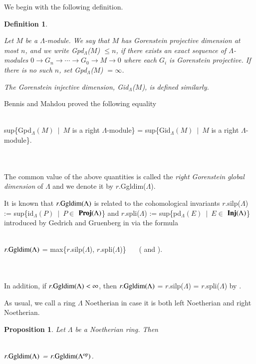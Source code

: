 \documentclass[11pt,a4paper]{article}
\newtheorem{prop}[thm]{Proposition}
\newtheorem{defn}[thm]{Definition}
\begin{document}
We begin with the following definition.

\begin{defn} \label{defn3} \rm{ Let $M$ be a    $\Lambda$-module.  We say that  $M$ has {\it Gorenstein projective
dimension} at most  $n$, and we write  Gpd$_{\Lambda}$($M$) $\leq n$, if there exists an exact sequence
of  $\Lambda$-modules $ 0 \rightarrow G_n\rightarrow
\cdots \rightarrow G_0\rightarrow M\rightarrow 0$ where each $G_{i}$ is Gorenstein projective. If there is no such $n$, set   Gpd$_{\Lambda}$($M$)
$=\infty$.

The {\it Gorenstein injective
dimension},  Gid$_{\Lambda}$($M$), is     defined similarly.}\end{defn}

Bennis   and Mahdou    \cite[Theorem 1.1]{bem} proved the     following equality
\\  \\
\centerline{   sup\{Gpd$_{\Lambda}(M)$\ $|$\ $M$     is  a  right  $\Lambda$-module\} =  sup\{Gid$_{\Lambda}(M)$\ $|$\ $M$     is  a  right  $\Lambda$-module\}.}\\ \\
The  common value of the above quantities is called the {\it right Gorenstein global
dimension} of $\Lambda$ and we denote it by     $r$.Ggldim($\Lambda$).

It is  known that $   r.{\rm Ggldim(}\Lambda)$  is related to the cohomological invariants $r$.silp($\Lambda$) := sup\{id$_{\Lambda}(P)$\ $|$\ $P\in$     ${\bf Proj}(\Lambda)$\} and $r$.spli($\Lambda$)  := sup\{pd$_{\Lambda}(E)$\ $|$\ $E \in$    ${\bf Inj}(\Lambda)$\}
introduced by Gedrich and Gruenberg in \cite{ged}  via the formula  \\
 \\
\centerline{ {\rm  $   r.{\rm Ggldim(}\Lambda)$ }{\rm = max\{$r$.silp($\Lambda$),  $r$.spli($\Lambda$)\}} \ \ \ (\cite[Theorem 3.3]{bou1} and  \cite[Theorem 2.1]{mad1}).}
 \\
 \\
In addition,  if  $   r.{\rm Ggldim(}\Lambda) < \infty$, then {\rm  $   r.{\rm Ggldim(}\Lambda)$ } = $r$.silp($\Lambda$) =  $r$.spli($\Lambda$) by   \cite[Proposition 2.3]{mad1}.

As usual, we call a ring $\Lambda$  Noetherian in case it is both left Noetherian and right Noetherian.

\begin{prop}\label{prop2}  Let $\Lambda$  be    a  Noetherian ring. Then \\
 \\
\centerline{   $   r.{\rm Ggldim(}\Lambda)$  =  $   r.{\rm Ggldim(}\Lambda^{{\rm op}})$.  } \end{prop}
\end{document}
